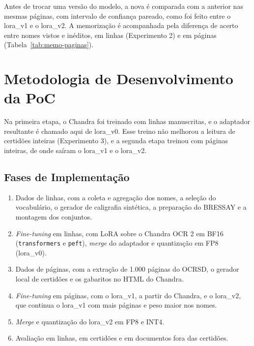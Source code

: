 Antes de trocar uma versão do modelo, a nova é comparada com a anterior nas mesmas páginas, com intervalo de confiança pareado, como foi feito entre o lora\_v1 e o lora\_v2. A memorização é acompanhada pela diferença de acerto entre nomes vistos e inéditos, em linhas (Experimento 2) e em páginas (Tabela~\ref{tab:memo-paginas}).

\section{Metodologia de Desenvolvimento da PoC}
\label{sec:metodologia}

Na primeira etapa, o Chandra foi treinado com linhas manuscritas, e o adaptador resultante é chamado aqui de lora\_v0. Esse treino não melhorou a leitura de certidões inteiras (Experimento 3), e a segunda etapa treinou com páginas inteiras, de onde saíram o lora\_v1 e o lora\_v2.

\subsection{Fases de Implementação}
\begin{enumerate}
    \item Dados de linhas, com a coleta e agregação dos nomes, a seleção do vocabulário, o gerador de caligrafia sintética, a preparação do BRESSAY e a montagem dos conjuntos.
    \item \emph{Fine-tuning} em linhas, com LoRA sobre o Chandra OCR 2 em BF16 (\texttt{transformers} e \texttt{peft}), \emph{merge} do adaptador e quantização em FP8 (lora\_v0).
    \item Dados de páginas, com a extração de 1.000 páginas do OCRSD, o gerador local de certidões e os gabaritos no HTML do Chandra.
    \item \emph{Fine-tuning} em páginas, com o lora\_v1, a partir do Chandra, e o lora\_v2, que continua o lora\_v1 com mais páginas e peso maior nos nomes.
    \item \emph{Merge} e quantização do lora\_v2 em FP8 e INT4.
    \item Avaliação em linhas, em certidões e em documentos fora das certidões.
\end{enumerate}

